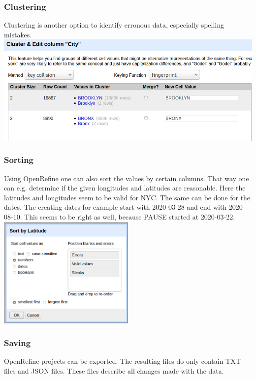 \documentclass{beamer}
\begin{document}
\begin{frame}
\frametitle{Clustering}
Clustering is another option to identify erronous data, especially spelling mistakes.
\vfill
\includegraphics[width = \textwidth]{pictures/clustering.png}
\end{frame}
\begin{frame}
\frametitle{Sorting}
Using OpenRefine one can also sort the values by certain columns. That way one can e.g. determine if the given longitudes and latitudes are reasonable.
Here the latitudes and longitudes seem to be valid for NYC.
\vfill
The same can be done for the dates. The creating dates for example start with 2020-03-28 and end with 2020-08-10. This seems to be right as well, because PAUSE started at 2020-03-22.
\vfill
\includegraphics[width=0.5\textwidth]{pictures/sorting.png}
\end{frame}
\begin{frame}
\frametitle{Saving}
OpenRefine projects can be exported. The resulting files do only contain TXT files and JSON files. These files describe all changes made with the data.
\end{frame}
\end{document}
